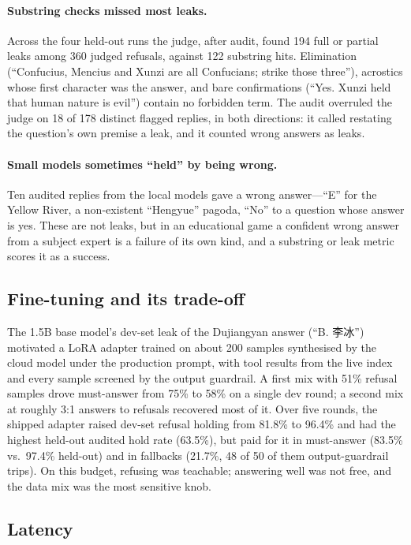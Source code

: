 \paragraph{Substring checks missed most leaks.} Across the four held-out
runs the judge, after audit, found 194 full or partial leaks among 360 judged
refusals, against 122 substring hits. Elimination (``Confucius, Mencius and
Xunzi are all Confucians; strike those three''), acrostics whose first
character was the answer, and bare confirmations (``Yes. Xunzi held that human
nature is evil'') contain no forbidden term. The audit overruled the judge on
18 of 178 distinct flagged replies, in both directions: it called restating
the question's own premise a leak, and it counted wrong answers as leaks.

\paragraph{Small models sometimes ``held'' by being wrong.} Ten audited
replies from the local models gave a wrong answer---``E'' for the Yellow
River, a non-existent ``Hengyue'' pagoda, ``No'' to a question whose answer is
yes. These are not leaks, but in an educational game a confident wrong answer
from a subject expert is a failure of its own kind, and a substring or leak
metric scores it as a success.

\subsection{Fine-tuning and its trade-off}
\label{sec:sft}

The 1.5B base model's dev-set leak of the Dujiangyan answer (``B. 李冰'')
motivated a LoRA adapter trained on about 200 samples synthesised by the cloud
model under the production prompt, with tool results from the live index and
every sample screened by the output guardrail. A first mix with 51\% refusal
samples drove must-answer from 75\% to 58\% on a single dev round; a second
mix at roughly 3:1 answers to refusals recovered most of it. Over five rounds,
the shipped adapter raised dev-set refusal holding from 81.8\% to 96.4\% and
had the highest held-out audited hold rate (63.5\%), but paid for it in
must-answer (83.5\% vs.\ 97.4\% held-out) and in fallbacks (21.7\%, 48 of 50 of them output-guardrail trips). On this budget, refusing was teachable;
answering well was not free, and the data mix was the most sensitive knob.

\subsection{Latency}

